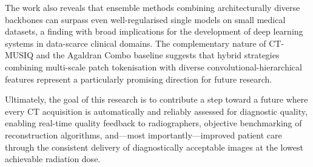 The work also reveals that ensemble methods combining architecturally diverse backbones
can surpass even well-regularised single models on small medical datasets, a finding with
broad implications for the development of deep learning systems in data-scarce clinical
domains. The complementary nature of CT-MUSIQ and the Agaldran Combo baseline suggests
that hybrid strategies combining multi-scale patch tokenisation with diverse
convolutional-hierarchical features represent a particularly promising direction for
future research.

Ultimately, the goal of this research is to contribute a step toward a future where every
CT acquisition is automatically and reliably assessed for diagnostic quality, enabling
real-time quality feedback to radiographers, objective benchmarking of reconstruction
algorithms, and---most importantly---improved patient care through the consistent delivery
of diagnostically acceptable images at the lowest achievable radiation dose.
